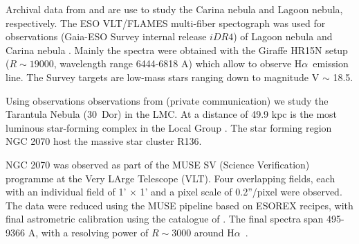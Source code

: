 \documentclass[fleqn,usenatbib, useAMS, a4paper]{mnras}
\newcommand\halpha{H${\alpha}$}
\begin{document}
Archival data from \citet{Damiani:2016a} and \citet{Damiani:2017b} are use to study the Carina nebula and Lagoon nebula, respectively. 
The ESO VLT/FLAMES multi-fiber spectograph was used for observations (Gaia-ESO Survey internal release \(iDR4\)) of Lagoon nebula  and Carina nebula \citep{2002Msngr.110....1P}. 
Mainly the spectra were obtained with the Giraffe HR15N setup (\(R \sim19 000\), wavelength range 6444-6818 A) which allow to observe \halpha\ emission line. 
The Survey targets are low-mass stars ranging down to magnitude V \(\sim\) 18.5.

Using observations observations from \citet{Castro:2018a} (private communication) we study the Tarantula Nebula (30~Dor) in the LMC.
At a distance of 49.9 kpc \citep{2013Natur.495...76P} is the most luminous star-forming complex in the Local Group \citep{1984ApJ...287..116K}.
The star forming region NGC 2070 host the massive star cluster R136.

NGC 2070 was observed as part of the MUSE SV (Science Verification) programme at the Very LArge Telescope (VLT). 
Four overlapping fields, each with an individual field of 1' \(\times\) 1' and a pixel scale of 0.2''/pixel were observed. 
The data were reduced using the MUSE pipeline based on ESOREX recipes, with final astrometric calibration using the catalogue of \citet{1999A&A...341...98S}. 
The final spectra span 495-9366 A, with a resolving power of \(R \sim3 000\) around \halpha\  \citep{Castro:2018a}.
\end{document}
